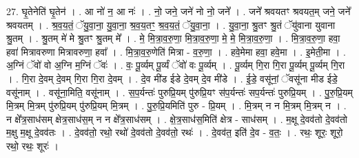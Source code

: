 \documentclass[17pt]{extarticle}
\begin{document}
27. घृ॒तेनेति॑ घृ॒तेन॑ । . आ नो॑ न॒ आ नः॑ । . नो॒ जने॒ जने॑ नो नो॒ जने᳚ । . जने᳚ श्रवयतꣳ श्रवयत॒म् जने॒ जने᳚ श्रवयतम् । . श्र॒व॒य॒तं॒ ॅयु॒वा॒ना॒ यु॒वा॒ना॒ श्र॒व॒य॒तꣳ॒॒ श्र॒व॒य॒तं॒ ॅयु॒वा॒ना॒ । . यु॒वा॒ना॒ श्रु॒तꣳ श्रु॒तं ॅयु॑वाना युवाना श्रु॒तम् । . श्रु॒तम् मे॑ मे श्रु॒तꣳ श्रु॒तम् मे᳚ । . मे॒ मि॒त्रा॒व॒रु॒णा॒ मि॒त्रा॒व॒रु॒णा॒ मे॒ मे॒ मि॒त्रा॒व॒रु॒णा॒ । . मि॒त्रा॒व॒रु॒णा॒ हवा॒ हवा॑ मित्रावरुणा मित्रावरुणा॒ हवा᳚ । . मि॒त्रा॒व॒रु॒णेति॑ मित्रा - व॒रु॒णा॒ । . हवे॒मेमा हवा॒ हवे॒मा । . इ॒मेती॒मा । . अ॒ग्निं ॅवो॑ वो अ॒ग्नि म॒ग्निं ॅवः॑ । . वः॒ पू॒र्व्यम् पू॒र्व्यं ॅवो॑ वः पू॒र्व्यम् । . पू॒र्व्यम् गि॒रा गि॒रा पू॒र्व्यम् पू॒र्व्यम् गि॒रा । . गि॒रा दे॒वम् दे॒वम् गि॒रा गि॒रा दे॒वम् । . दे॒व मी॑ड ईडे दे॒वम् दे॒व मी॑डे । . ई॒डे॒ वसू॑नां॒ ॅवसू॑ना मीड ईडे॒ वसू॑नाम् । . वसू॑ना॒मिति॒ वसू॑नाम् । . स॒प॒र्यन्तः॑ पुरुप्रि॒यम् पु॑रुप्रि॒यꣳ स॑प॒र्यन्तः॑ सप॒र्यन्तः॑ पुरुप्रि॒यम् । . पु॒रु॒प्रि॒यम् मि॒त्रम् मि॒त्रम् पु॑रुप्रि॒यम् पु॑रुप्रि॒यम् मि॒त्रम् । . पु॒रु॒प्रि॒यमिति॑ पुरु - प्रि॒यम् । . मि॒त्रम् न न मि॒त्रम् मि॒त्रम् न । . न क्षे᳚त्र॒साध॑सम् क्षेत्र॒साध॑स॒म् न न क्षे᳚त्र॒साध॑सम् । . क्षे॒त्र॒साध॑स॒मिति॑ क्षेत्र - साध॑सम् । . म॒क्षू दे॒वव॑तो दे॒वव॑तो म॒क्षु म॒क्षू दे॒वव॑तः । . दे॒वव॑तो॒ रथो॒ रथो॑ दे॒वव॑तो दे॒वव॑तो॒ रथः॑ । . दे॒वव॑त॒ इति॑ दे॒व - व॒तः॒ । . रथः॒ शूरः॒ शूरो॒ रथो॒ रथः॒ शूरः॑ । \newline
\end{document}
